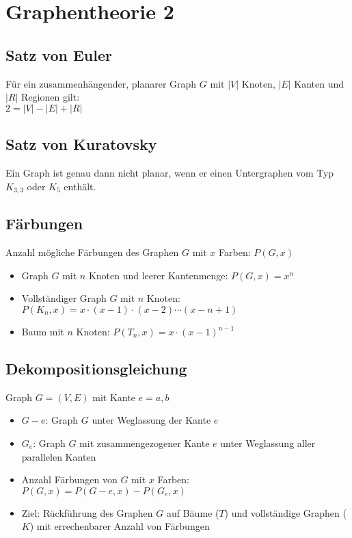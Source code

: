 \section{Graphentheorie 2}

\subsection{Satz von Euler}

Für ein zusammenhängender, planarer Graph $G$ mit $|V|$ Knoten, $|E|$ Kanten und $|R|$ Regionen gilt:
\\
$2 = |V| - |E| + |R|$

\subsection{Satz von Kuratovsky}

Ein Graph ist genau dann nicht planar, wenn er einen Untergraphen vom Typ $K_{3,3}$ oder $K_5$ enthält.

\subsection{Färbungen}

Anzahl mögliche Färbungen des Graphen $G$ mit $x$ Farben: $P(G,x)$

\begin{itemize}
    \item{Graph $G$ mit $n$ Knoten und leerer Kantenmenge: $P(G,x)=x^n$}
    \item{Vollständiger Graph $G$ mit $n$ Knoten: $P(K_n,x)=x \cdot (x-1) \cdot (x-2) \cdots (x-n+1)$}
    \item{Baum mit $n$ Knoten: $P(T_n,x)=x \cdot (x-1)^{n-1}$}
\end{itemize}

\subsection{Dekompositionsgleichung}

Graph $G = (V,E)$ mit Kante $e={a,b}$

\begin{itemize}
    \item{$G-e$: Graph $G$ unter Weglassung der Kante $e$}
    \item{$G_e$: Graph $G$ mit zusammengezogener Kante $e$ unter Weglassung aller parallelen Kanten}
    \item{Anzahl Färbungen von $G$ mit $x$ Farben: $P(G,x)=P(G-e,x)-P(G_e,x)$}
    \item{Ziel: Rückführung des Graphen $G$ auf Bäume ($T$) und vollständige Graphen ($K$) mit errechenbarer Anzahl von Färbungen}
\end{itemize}


